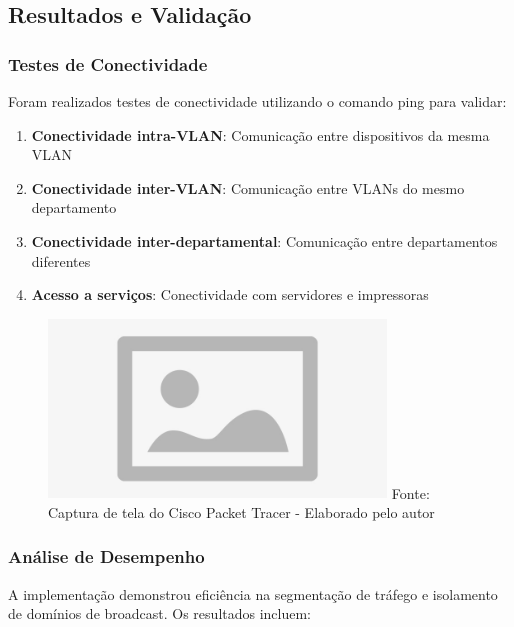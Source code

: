 \subsection{Resultados e Validação}

\subsubsection{Testes de Conectividade}

Foram realizados testes de conectividade utilizando o comando ping para validar:

\begin{enumerate}
    \item \textbf{Conectividade intra-VLAN}: Comunicação entre dispositivos da mesma VLAN
    \item \textbf{Conectividade inter-VLAN}: Comunicação entre VLANs do mesmo departamento
    \item \textbf{Conectividade inter-departamental}: Comunicação entre departamentos diferentes
    \item \textbf{Acesso a serviços}: Conectividade com servidores e impressoras
\end{enumerate}

\begin{figure}[H]
\centering
{}
\includegraphics[width=0.8\textwidth]{figure/placeholder.jpg}
\label{fig:testes_conectividade}
{\fontsize{10pt}{\baselineskip}\selectfont
Fonte: Captura de tela do Cisco Packet Tracer - Elaborado pelo autor}
\end{figure}

\subsubsection{Análise de Desempenho}

A implementação demonstrou eficiência na segmentação de tráfego e isolamento de domínios de broadcast. Os resultados incluem:


